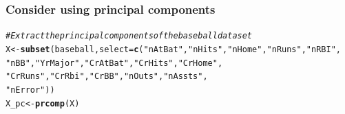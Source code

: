 \documentclass{article}\usepackage[]{graphicx}\usepackage[]{color}
\makeatletter
\newcommand{\hlstr}[1]{\textcolor[rgb]{0.192,0.494,0.8}{#1}}%
\newcommand{\hlcom}[1]{\textcolor[rgb]{0.678,0.584,0.686}{\textit{#1}}}%
\newcommand{\hlstd}[1]{\textcolor[rgb]{0.345,0.345,0.345}{#1}}%
\newcommand{\hlkwb}[1]{\textcolor[rgb]{0.69,0.353,0.396}{#1}}%
\newcommand{\hlkwc}[1]{\textcolor[rgb]{0.333,0.667,0.333}{#1}}%
\newcommand{\hlkwd}[1]{\textcolor[rgb]{0.737,0.353,0.396}{\textbf{#1}}}%
\newenvironment{kframe}{%
 \def\at@end@of@kframe{}%
 \ifinner\ifhmode%
  \def\at@end@of@kframe{\end{minipage}}%
  \begin{minipage}{\columnwidth}%
 \fi\fi%
 \def\FrameCommand##1{\hskip\@totalleftmargin \hskip-\fboxsep
 \colorbox{shadecolor}{##1}\hskip-\fboxsep
     \hskip-\linewidth \hskip-\@totalleftmargin \hskip\columnwidth}%
 \MakeFramed {\advance\hsize-\width
   \@totalleftmargin\z@ \linewidth\hsize
   \@setminipage}}%
 {\par\unskip\endMakeFramed%
 \at@end@of@kframe}
\newenvironment{knitrout}{}{} %
\makeatother
\begin{document}
\subsubsection*{Consider using principal components}

\begin{knitrout}
\color{fgcolor}\begin{kframe}
\begin{alltt}
\hlcom{# Extract the principal components of the baseball dataset}
\hlstd{X} \hlkwb{<-} \hlkwd{subset}\hlstd{(baseball,} \hlkwc{select} \hlstd{=} \hlkwd{c}\hlstd{(}\hlstr{"nAtBat"}\hlstd{,} \hlstr{"nHits"}\hlstd{,} \hlstr{"nHome"}\hlstd{,} \hlstr{"nRuns"}\hlstd{,} \hlstr{"nRBI"}\hlstd{,}
                                 \hlstr{"nBB"}\hlstd{,} \hlstr{"YrMajor"}\hlstd{,} \hlstr{"CrAtBat"}\hlstd{,} \hlstr{"CrHits"}\hlstd{,} \hlstr{"CrHome"}\hlstd{,}
                                 \hlstr{"CrRuns"}\hlstd{,} \hlstr{"CrRbi"}\hlstd{,} \hlstr{"CrBB"}\hlstd{,} \hlstr{"nOuts"}\hlstd{,} \hlstr{"nAssts"}\hlstd{,}
                                 \hlstr{"nError"}\hlstd{))}
\hlstd{X_pc} \hlkwb{<-} \hlkwd{prcomp}\hlstd{(X)}


\end{alltt}
\end{kframe}
\end{knitrout}
\end{document}
